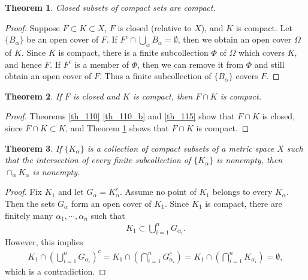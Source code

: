 \documentclass[11pt]{book}
\newtheorem{theorem}{Theorem}[chapter]
\theoremstyle{definition}
\numberwithin{equation}{chapter}
\begin{document}
\medskip

\begin{theorem}\label{th_116}
Closed subsets of compact sets are compact.
\end{theorem}
\begin{proof}
Suppose $F \subset K \subset X$, $F$ is closed (relative to $X$), and $K$ is compact. Let $\{B_{\alpha}\}$ be an open cover of $F$. If $F^c \cap \bigcup_{\alpha}B_{\alpha} = \emptyset$, then we obtain an open cover $\Omega$ of $K$. Since $K$ is compact, there is a finite subcollection $\Phi$ of $\Omega$ which covers $K$, and hence $F$. If $F^c$ is a member of $\Phi$, then we can remove it from $\Phi$ and still obtain an open cover of $F$. Thus a finite subcollection of $\{B_{\alpha}\}$ covers $F$.
\end{proof}

\medskip

\begin{theorem}
If $F$ is closed and $K$ is compact, then $F \cap K$ is compact.
\end{theorem}
\begin{proof}
Theorems \ref{th_110} \ref{th_110_b} and \ref{th_115} show that $F \cap K$ is closed, since $F \cap K \subset K$, and Theorem \ref{th_116} shows that $F \cap K$ is compact.
\end{proof}

\medskip

\begin{theorem}\label{th_118}
If $\{K_{\alpha}\}$ is a collection of compact subsets of a metric space $X$ such that the intersection of every finite subcollection of $\{K_{\alpha}\}$ is nonempty, then $\cap_{\alpha} K_{\alpha}$ is nonempty.
\end{theorem}
\begin{proof}
Fix $K_1$ and let $G_{\alpha} = K_{\alpha}^c$. Assume no point of $K_1$ belongs to every $K_{\alpha}$. Then the sets $G_{\alpha}$ form an open cover of $K_1$. Since $K_1$ is compact, there are finitely many $\alpha_1, \cdots, \alpha_n$ such that
\begin{align*}
    K_1 \subset \bigcup^n_{i=1} G_{\alpha_i}.
\end{align*}
However, this implies
\begin{align*}
    K_1 \cap \left(\bigcup^n_{i=1} G_{\alpha_i}\right)^c = K_1 \cap \left(\bigcap^n_{i=1} G_{\alpha_i}^c\right) = K_1 \cap \left(\bigcap^n_{i=1} K_{\alpha_i}\right) = \emptyset,
\end{align*}
which is a contradiction.
\end{proof}
\end{document}
